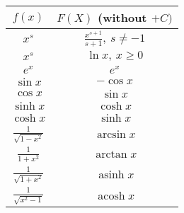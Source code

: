 \documentclass[8pt,a4paper,twocolumn,table]{extarticle}
\DeclareMathOperator{\acosh}{acosh}
\DeclareMathOperator{\asinh}{asinh}
\begin{document}
\begin{tabular}{| c | c |}
    \hline
    \rowcolor{lightgray} $f(x)$ & $F(X)$ (without $+ C)$               \\
    \hline
    $x^s$                       & $\frac{x^{s + 1}}{s + 1},\ s \ne -1$ \\
    \hline
    $x^s$                       & $\ln x,\ x \ge 0$                    \\
    \hline
    $e^x$                       & $e^x$                                \\
    \hline
    $\sin x$                    & $-\cos x$                            \\
    \hline
    $\cos x$                    & $\sin x$                             \\
    \hline
    $\sinh x$                   & $\cosh x$                            \\
    \hline
    $\cosh x$                   & $\sinh x$                            \\
    \hline
    $\frac{1}{\sqrt{1 - x^2}}$  & $\arcsin x$                          \\
    \hline
    $\frac{1}{1 + x^2}$         & $\arctan x$                          \\
    \hline
    $\frac{1}{\sqrt{1 + x^2}}$  & $\asinh x$                           \\
    \hline
    $\frac{1}{\sqrt{x^2 - 1}}$  & $\acosh x$                           \\
    \hline
\end{tabular}

\end{document}
